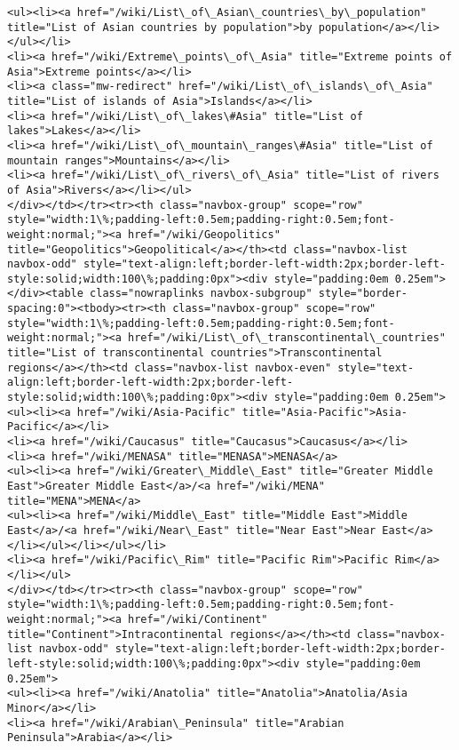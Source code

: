 \documentclass[11pt]{article}
\begin{document}
\begin{Verbatim}[commandchars=\\\{\}]
<ul><li><a href="/wiki/List\_of\_Asian\_countries\_by\_population" title="List of Asian countries by population">by population</a></li></ul></li>
<li><a href="/wiki/Extreme\_points\_of\_Asia" title="Extreme points of Asia">Extreme points</a></li>
<li><a class="mw-redirect" href="/wiki/List\_of\_islands\_of\_Asia" title="List of islands of Asia">Islands</a></li>
<li><a href="/wiki/List\_of\_lakes\#Asia" title="List of lakes">Lakes</a></li>
<li><a href="/wiki/List\_of\_mountain\_ranges\#Asia" title="List of mountain ranges">Mountains</a></li>
<li><a href="/wiki/List\_of\_rivers\_of\_Asia" title="List of rivers of Asia">Rivers</a></li></ul>
</div></td></tr><tr><th class="navbox-group" scope="row" style="width:1\%;padding-left:0.5em;padding-right:0.5em;font-weight:normal;"><a href="/wiki/Geopolitics" title="Geopolitics">Geopolitical</a></th><td class="navbox-list navbox-odd" style="text-align:left;border-left-width:2px;border-left-style:solid;width:100\%;padding:0px"><div style="padding:0em 0.25em"></div><table class="nowraplinks navbox-subgroup" style="border-spacing:0"><tbody><tr><th class="navbox-group" scope="row" style="width:1\%;padding-left:0.5em;padding-right:0.5em;font-weight:normal;"><a href="/wiki/List\_of\_transcontinental\_countries" title="List of transcontinental countries">Transcontinental regions</a></th><td class="navbox-list navbox-even" style="text-align:left;border-left-width:2px;border-left-style:solid;width:100\%;padding:0px"><div style="padding:0em 0.25em">
<ul><li><a href="/wiki/Asia-Pacific" title="Asia-Pacific">Asia-Pacific</a></li>
<li><a href="/wiki/Caucasus" title="Caucasus">Caucasus</a></li>
<li><a href="/wiki/MENASA" title="MENASA">MENASA</a>
<ul><li><a href="/wiki/Greater\_Middle\_East" title="Greater Middle East">Greater Middle East</a>/<a href="/wiki/MENA" title="MENA">MENA</a>
<ul><li><a href="/wiki/Middle\_East" title="Middle East">Middle East</a>/<a href="/wiki/Near\_East" title="Near East">Near East</a></li></ul></li></ul></li>
<li><a href="/wiki/Pacific\_Rim" title="Pacific Rim">Pacific Rim</a></li></ul>
</div></td></tr><tr><th class="navbox-group" scope="row" style="width:1\%;padding-left:0.5em;padding-right:0.5em;font-weight:normal;"><a href="/wiki/Continent" title="Continent">Intracontinental regions</a></th><td class="navbox-list navbox-odd" style="text-align:left;border-left-width:2px;border-left-style:solid;width:100\%;padding:0px"><div style="padding:0em 0.25em">
<ul><li><a href="/wiki/Anatolia" title="Anatolia">Anatolia/Asia Minor</a></li>
<li><a href="/wiki/Arabian\_Peninsula" title="Arabian Peninsula">Arabia</a></li>

\end{Verbatim}
\end{document}
